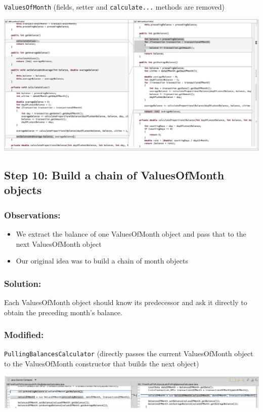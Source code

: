 \documentclass[a4paper,fleqn,titlepage,11pt]{article}
\begin{document}
\texttt{ValuesOfMonth} (fields, setter and \texttt{calculate...} methods are removed)

\includegraphics[width=1\textwidth]{CompareViews/08-09.jpg}

\subsection*{Step 10: Build a chain of ValuesOfMonth objects}

\subsubsection*{Observations:}
\begin{itemize}
\item  We extract the balance of one ValuesOfMonth object and pass that to the next ValuesOfMonth object
\item Our original idea was to build a chain of month objects
\end{itemize}

\subsubsection*{Solution:}

Each ValuesOfMonth object should know its predecessor and ask it directly to obtain the preceding month's balance.

\subsubsection*{Modified:}

\texttt{PullingBalancesCalculator} (directly passes the current ValuesOfMonth object to the ValuesOfMonth constructor that builds the next object)

\includegraphics[width=1\textwidth]{CompareViews/09-10-1.png}
\end{document}
